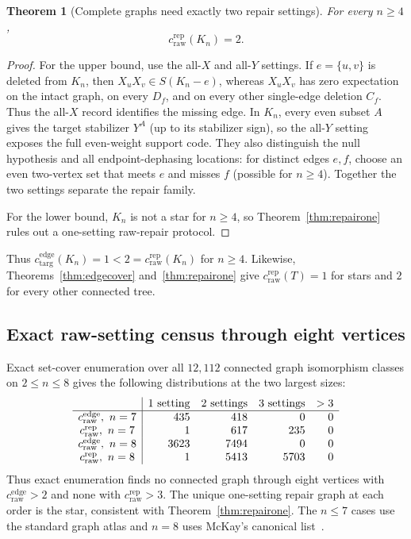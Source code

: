 \documentclass[11pt]{article}
\newtheorem{theorem}{Theorem}[section]
\theoremstyle{remark}
\newcommand{\cdiag}{c_{\mathrm{targ}}^{\mathrm{edge}}}
\newcommand{\ccutraw}{c_{\mathrm{raw}}^{\mathrm{edge}}}
\newcommand{\crep}{c_{\mathrm{raw}}^{\mathrm{rep}}}
\begin{document}
\begin{theorem}[Complete graphs need exactly two repair settings]\label{thm:repaircomplete}
For every $n\ge4$,
\[
\crep(K_n)=2.
\]
\end{theorem}
\begin{proof}
For the upper bound, use the all-$X$ and all-$Y$ settings. If $e=\{u,v\}$ is deleted from $K_n$, then $X_uX_v\in S(K_n-e)$, whereas $X_uX_v$ has zero expectation on the intact graph, on every $D_f$, and on every other single-edge deletion $C_f$. Thus the all-$X$ record identifies the missing edge. In $K_n$, every even subset $A$ gives the target stabilizer $Y^A$ (up to its stabilizer sign), so the all-$Y$ setting exposes the full even-weight support code. They also distinguish the null hypothesis and all endpoint-dephasing locations: for distinct edges $e,f$, choose an even two-vertex set that meets $e$ and misses $f$ (possible for $n\ge4$). Together the two settings separate the repair family.

For the lower bound, $K_n$ is not a star for $n\ge4$, so Theorem~\ref{thm:repairone} rules out a one-setting raw-repair protocol.
\end{proof}

Thus $\cdiag(K_n)=1<2=\crep(K_n)$ for $n\ge4$. Likewise, Theorems~\ref{thm:edgecover} and~\ref{thm:repairone} give $\crep(T)=1$ for stars and $2$ for every other connected tree.

\subsection{Exact raw-setting census through eight vertices}\label{sec:census8}
Exact set-cover enumeration over all $12{,}112$ connected graph isomorphism classes on $2\le n\le8$ gives the following distributions at the two largest sizes:
\[
\begin{array}{c|rrrr}
 & 1\text{ setting}&2\text{ settings}&3\text{ settings}&>3\\ \hline
c_{\rm raw}^{\rm edge},\ n=7&435&418&0&0\\
c_{\rm raw}^{\rm rep},\ n=7&1&617&235&0\\
c_{\rm raw}^{\rm edge},\ n=8&3623&7494&0&0\\
c_{\rm raw}^{\rm rep},\ n=8&1&5413&5703&0
\end{array}
\]
Thus exact enumeration finds no connected graph through eight vertices with $\ccutraw>2$ and none with $\crep>3$. The unique one-setting repair graph at each order is the star, consistent with Theorem~\ref{thm:repairone}.  The $n\le7$ cases use the standard graph atlas and $n=8$ uses McKay's canonical list~\cite{McKayData}.
\end{document}

